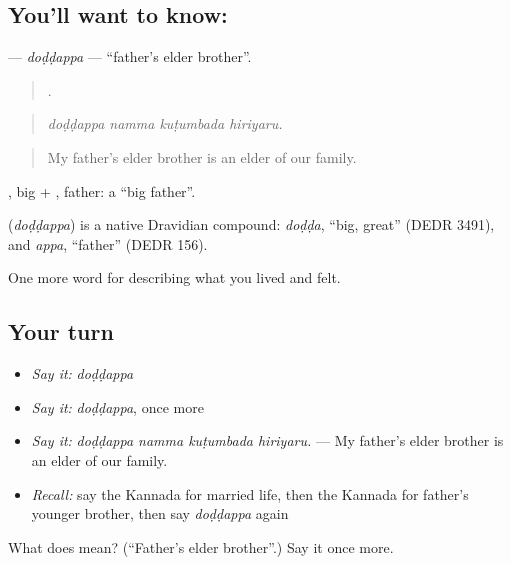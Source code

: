 \subsection*{You'll want to know: }
\textbf{} — \emph{doḍḍappa} — \textquotedblleft{}father's elder brother\textquotedblright{}.

\begin{quote}
   .
\end{quote}

\begin{quote}
\emph{doḍḍappa namma kuṭumbada hiriyaru.}
\end{quote}

\begin{quote}
My father's elder brother is an elder of our family.
\end{quote}

, big + , father: a \textquotedblleft{}big father\textquotedblright{}.

\begin{cousinweb}
\textbf{} (\emph{doḍḍappa}) is a native Dravidian compound: \emph{doḍḍa}, \textquotedblleft{}big, great\textquotedblright{} (DEDR 3491), and \emph{appa}, \textquotedblleft{}father\textquotedblright{} (DEDR 156).
\end{cousinweb}

\begin{grammarlens}[title={What you've built}]
One more word for describing what you lived and felt.
\end{grammarlens}

\subsection*{Your turn}
\begin{itemize}
\raggedright
  \item \emph{Say it:} \emph{doḍḍappa}
  \item \emph{Say it:} \emph{doḍḍappa}, once more
  \item \emph{Say it:} \emph{doḍḍappa namma kuṭumbada hiriyaru.} — My father's elder brother is an elder of our family.
  \item \emph{Recall:} say the Kannada for married life, then the Kannada for father's younger brother, then say \emph{doḍḍappa} again
\end{itemize}

\begin{tcolorbox}[breakable,colback=teal!4,colframe=teal!35!black,title={Before you move on}]
What does  mean? (\textquotedblleft{}Father's elder brother\textquotedblright{}.) Say it once more.
\end{tcolorbox}
